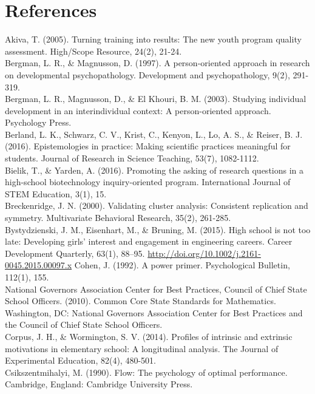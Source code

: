 \documentclass[]{msu-thesis}
\theoremstyle{definition}
\theoremstyle{definition}
\theoremstyle{definition}
\theoremstyle{remark}
\begin{document}
\newpage

\chapter{References}\label{references}

Akiva, T. (2005). Turning training into results: The new youth program
quality assessment. High/Scope Resource, 24(2), 21-24.\\
Bergman, L. R., \& Magnusson, D. (1997). A person-oriented approach in
research on developmental psychopathology. Development and
psychopathology, 9(2), 291-319.\\
Bergman, L. R., Magnusson, D., \& El Khouri, B. M. (2003). Studying
individual development in an interindividual context: A person-oriented
approach. Psychology Press.\\
Berland, L. K., Schwarz, C. V., Krist, C., Kenyon, L., Lo, A. S., \&
Reiser, B. J. (2016). Epistemologies in practice: Making scientific
practices meaningful for students. Journal of Research in Science
Teaching, 53(7), 1082-1112.\\
Bielik, T., \& Yarden, A. (2016). Promoting the asking of research
questions in a high-school biotechnology inquiry-oriented program.
International Journal of STEM Education, 3(1), 15.\\
Breckenridge, J. N. (2000). Validating cluster analysis: Consistent
replication and symmetry. Multivariate Behavioral Research, 35(2),
261-285.\\
Bystydzienski, J. M., Eisenhart, M., \& Bruning, M. (2015). High school
is not too late: Developing girls' interest and engagement in
engineering careers. Career Development Quarterly, 63(1), 88--95.
\url{http://doi.org/10.1002/j.2161-0045.2015.00097.x} Cohen, J. (1992).
A power primer. Psychological Bulletin, 112(1), 155.\\
National Governors Association Center for Best Practices, Council of
Chief State School Officers. (2010). Common Core State Standards for
Mathematics. Washington, DC: National Governors Association Center for
Best Practices and the Council of Chief State School Officers.\\
Corpus, J. H., \& Wormington, S. V. (2014). Profiles of intrinsic and
extrinsic motivations in elementary school: A longitudinal analysis. The
Journal of Experimental Education, 82(4), 480-501.\\
Csikszentmihalyi, M. (1990). Flow: The psychology of optimal
performance. Cambridge, England: Cambridge University Press.\\
\end{document}
